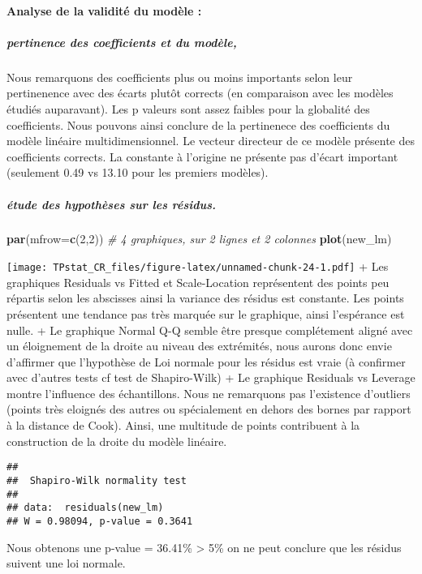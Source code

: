 \documentclass[
]{article}
\newenvironment{Shaded}{\begin{snugshade}}{\end{snugshade}}
\newcommand{\CommentTok}[1]{\textcolor[rgb]{0.56,0.35,0.01}{\textit{#1}}}
\newcommand{\DataTypeTok}[1]{\textcolor[rgb]{0.13,0.29,0.53}{#1}}
\newcommand{\DecValTok}[1]{\textcolor[rgb]{0.00,0.00,0.81}{#1}}
\newcommand{\KeywordTok}[1]{\textcolor[rgb]{0.13,0.29,0.53}{\textbf{#1}}}
\newcommand{\NormalTok}[1]{#1}
\begin{document}
\hypertarget{analyse-de-la-validituxe9-du-moduxe8le-2}{%
\paragraph{Analyse de la validité du modèle
:}\label{analyse-de-la-validituxe9-du-moduxe8le-2}}

\hypertarget{pertinence-des-coefficients-et-du-moduxe8le-1}{%
\subparagraph{pertinence des coefficients et du
modèle,}\label{pertinence-des-coefficients-et-du-moduxe8le-1}}

Nous remarquons des coefficients plus ou moins importants selon leur
pertinenence avec des écarts plutôt corrects (en comparaison avec les
modèles étudiés auparavant). Les p valeurs sont assez faibles pour la
globalité des coefficients. Nous pouvons ainsi conclure de la
pertinenece des coefficients du modèle linéaire multidimensionnel. Le
vecteur directeur de ce modèle présente des coefficients corrects. La
constante à l'origine ne présente pas d'écart important (seulement 0.49
vs 13.10 pour les premiers modèles).

\hypertarget{uxe9tude-des-hypothuxe8ses-sur-les-ruxe9sidus.-1}{%
\subparagraph{étude des hypothèses sur les
résidus.}\label{uxe9tude-des-hypothuxe8ses-sur-les-ruxe9sidus.-1}}

\begin{Shaded}
\begin{Highlighting}[]
\KeywordTok{par}\NormalTok{(}\DataTypeTok{mfrow=}\KeywordTok{c}\NormalTok{(}\DecValTok{2}\NormalTok{,}\DecValTok{2}\NormalTok{)) }\CommentTok{# 4 graphiques, sur 2 lignes et 2 colonnes}
\KeywordTok{plot}\NormalTok{(new_lm)}
\end{Highlighting}
\end{Shaded}

\texttt{[image: TPstat\_CR\_files/figure-latex/unnamed-chunk-24-1.pdf]} +
Les graphiques Residuals vs Fitted et Scale-Location représentent des
points peu répartis selon les abscisses ainsi la variance des résidus
est constante. Les points présentent une tendance pas très marquée sur
le graphique, ainsi l'espérance est nulle. + Le graphique Normal Q-Q
semble être presque complétement aligné avec un éloignement de la droite
au niveau des extrémités, nous aurons donc envie d'affirmer que
l'hypothèse de Loi normale pour les résidus est vraie (à confirmer avec
d'autres tests cf test de Shapiro-Wilk) + Le graphique Residuals vs
Leverage montre l'influence des échantillons. Nous ne remarquons pas
l'existence d'outliers (points très eloignés des autres ou spécialement
en dehors des bornes par rapport à la distance de Cook). Ainsi, une
multitude de points contribuent à la construction de la droite du modèle
linéaire.

\begin{verbatim}
## 
##  Shapiro-Wilk normality test
## 
## data:  residuals(new_lm)
## W = 0.98094, p-value = 0.3641
\end{verbatim}

Nous obtenons une p-value = 36.41\% \textgreater{} 5\% on ne peut
conclure que les résidus suivent une loi normale.
\end{document}
